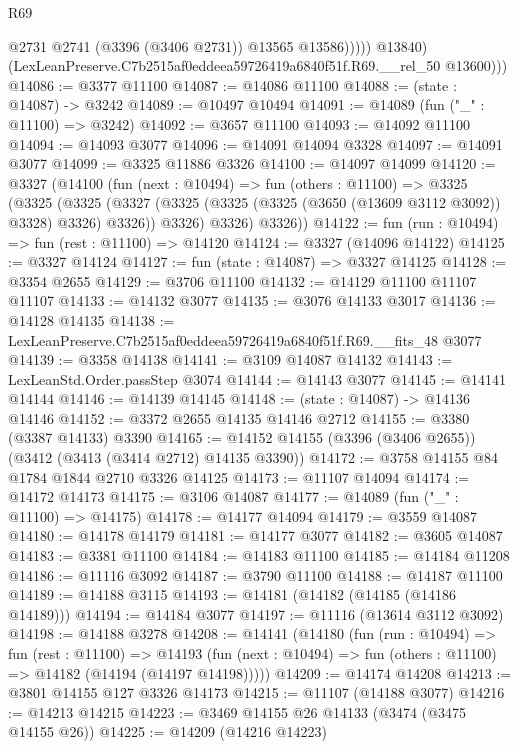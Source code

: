 \begin{lexlean}{R69}
\begin{coremodule}
                    @2731
                    @2741
                    (@3396 (@3406 @2731))
                    @13565
                    @13586)))))
          @13840)
        (LexLeanPreserve.C7b2515af0eddeea59726419a6840f51f.R69.__rel_50 @13600)))
@14086 := @3377 @11100
@14087 := @14086 @11100
@14088 := (state : @14087) -> @3242
@14089 := @10497 @10494
@14091 := @14089 (fun ("_" : @11100) => @3242)
@14092 := @3657 @11100
@14093 := @14092 @11100
@14094 := @14093 @3077
@14096 := @14091 @14094 @3328
@14097 := @14091 @3077
@14099 := @3325 @11886 @3326
@14100 := @14097 @14099
@14120 := @3327
    (@14100
      (fun (next : @10494) =>
      fun (others : @11100) =>
      @3325
        (@3325
          (@3325
            (@3327 (@3325 (@3325 (@3325 (@3650 (@13609 @3112 @3092)) @3328) @3326) @3326))
            @3326)
          @3326)
        @3326))
@14122 := fun (run : @10494) => fun (rest : @11100) => @14120
@14124 := @3327 (@14096 @14122)
@14125 := @3327 @14124
@14127 := fun (state : @14087) => @3327 @14125
@14128 := @3354 @2655
@14129 := @3706 @11100
@14132 := @14129 @11100 @11107 @11107
@14133 := @14132 @3077
@14135 := @3076 @14133 @3017
@14136 := @14128 @14135
@14138 := LexLeanPreserve.C7b2515af0eddeea59726419a6840f51f.R69.__fits_48 @3077
@14139 := @3358 @14138
@14141 := @3109 @14087 @14132
@14143 := LexLeanStd.Order.passStep @3074
@14144 := @14143 @3077
@14145 := @14141 @14144
@14146 := @14139 @14145
@14148 := (state : @14087) -> @14136 @14146
@14152 := @3372 @2655 @14135 @14146 @2712
@14155 := @3380 (@3387 @14133) @3390
@14165 := @14152 @14155 (@3396 (@3406 @2655)) (@3412 (@3413 (@3414 @2712) @14135 @3390))
@14172 := @3758 @14155 @84 @1784 @1844 @2710 @3326 @14125
@14173 := @11107 @14094
@14174 := @14172 @14173
@14175 := @3106 @14087
@14177 := @14089 (fun ("_" : @11100) => @14175)
@14178 := @14177 @14094
@14179 := @3559 @14087
@14180 := @14178 @14179
@14181 := @14177 @3077
@14182 := @3605 @14087
@14183 := @3381 @11100
@14184 := @14183 @11100
@14185 := @14184 @11208
@14186 := @11116 @3092
@14187 := @3790 @11100
@14188 := @14187 @11100
@14189 := @14188 @3115
@14193 := @14181 (@14182 (@14185 (@14186 @14189)))
@14194 := @14184 @3077
@14197 := @11116 (@13614 @3112 @3092)
@14198 := @14188 @3278
@14208 := @14141
    (@14180
      (fun (run : @10494) =>
      fun (rest : @11100) =>
      @14193 (fun (next : @10494) => fun (others : @11100) => @14182 (@14194 (@14197 @14198)))))
@14209 := @14174 @14208
@14213 := @3801 @14155 @127 @3326 @14173
@14215 := @11107 (@14188 @3077)
@14216 := @14213 @14215
@14223 := @3469 @14155 @26 @14133 (@3474 (@3475 @14155 @26))
@14225 := @14209 (@14216 @14223)

\end{coremodule}
\end{lexlean}
